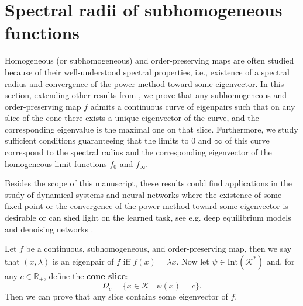 \documentclass{article}
\newcommand{\R}{\mathbb{R}}
\newcommand{\cone}{\mathcal{K}}
\newcommand{\interior}{\mathrm{Int}}
\begin{document}
\section{Spectral radii of subhomogeneous functions}\label{subsec:joint_spectral_radii_of_subhomogeneous_maps}

Homogeneous (or subhomogeneous) and order-preserving maps are often studied because of their well-understood spectral properties, i.e., existence of a spectral radius and convergence of the power method toward some eigenvector. In this section, extending other results from \cite{nuzman2007contraction, cavalcante2019connections}, we prove that any subhomogeneous and order-preserving map $f$ admits a continuous curve of eigenpairs such that on any slice of the cone there exists a unique eigenvector of the curve, and the corresponding eigenvalue is the maximal one on that slice. Furthermore, we study sufficient conditions guaranteeing that the limits to $0$ and $\infty$ of this curve correspond to the spectral radius and the corresponding eigenvector of the homogeneous limit functions $f_0$ and $f_{\infty}$.

Besides the scope of this manuscript, these results could find applications in the study of dynamical systems and neural networks where the existence of some fixed point or the convergence of the power method toward some eigenvector is desirable or can shed light on the learned task, see e.g. deep equilibrium models \cite{bai2019deep, piotrowski2024fixed} and denoising networks \cite{bungert2021nonlinear}. 

Let $f$ be a continuous, subhomogeneous, and order-preserving map, then we say that $(x,\lambda)$ is an eigenpair of $f$ iff $f(x)=\lambda x$. Now let $\psi\in \interior(\cone^*)$ and, for any $c\in \R_+$, define the \textbf{cone slice}: 
\begin{equation}\label{Def_cone_slice}
    \Omega_c=\{x\in \cone\;|\; \psi(x)=c\}.
\end{equation} 
Then we can prove that any slice contains some eigenvector of $f$.
\end{document}
